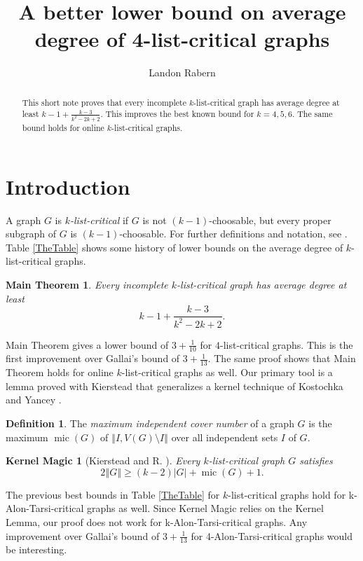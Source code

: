 \documentclass[12pt]{article}
\title{A better lower bound on average degree of 4-list-critical graphs}
\author{Landon Rabern}
\theoremstyle{plain}
\newtheorem*{KernelMagic}{Kernel Magic}
\newtheorem*{MainTheorem}{Main Theorem}
\theoremstyle{definition}
\newtheorem*{TheDefinition}{Definition}
\theoremstyle{remark}
\newcommand{\card}[1]{\left|#1\right|}
\newcommand{\size}[1]{\left\Vert#1\right\Vert}
\newcommand{\mic}{\operatorname{mic}}
\begin{document}
\maketitle
\begin{abstract}
		This short note proves that every incomplete $k$-list-critical graph has average degree at least $k-1 + \frac{k-3}{k^2-2k+2}$.  This improves the best known bound for $k = 4,5,6$.
		The same bound holds for online $k$-list-critical graphs.
\end{abstract}

\section{Introduction}
A graph $G$ is \emph{$k$-list-critical} if $G$ is not $(k-1)$-choosable, but every
proper subgraph of $G$ is $(k-1)$-choosable.  For further definitions and notation, see \cite{OreVizing, DischargingLowerBound}. 
Table \ref{TheTable} shows some history of lower bounds on the average degree of $k$-list-critical graphs.

\begin{MainTheorem}
	Every incomplete $k$-list-critical graph has average degree at least \[k-1 + \frac{k-3}{k^2-2k+2}.\]
\end{MainTheorem}

Main Theorem gives a lower bound of $3 + \frac{1}{10}$ for $4$-list-critical graphs. This is the first improvement over Gallai's bound of $3 + \frac{1}{13}$. 
The same proof shows that Main Theorem holds for online $k$-list-critical graphs as well.  Our primary tool is a lemma proved with Kierstead \cite{KernelMagic} 
that generalizes a kernel technique of Kostochka and Yancey \cite{kostochkayancey2012ore}.

\begin{TheDefinition} The \emph{maximum independent cover number }of a graph $G$
	is the maximum $\mic(G)$ of $\size{I, V(G) \setminus I}$ over all independent sets $I$
	of $G$. 
\end{TheDefinition}

\begin{KernelMagic}[Kierstead and R. \cite{KernelMagic}]\label{ConsantListMicStrength} 
	Every $k$-list-critical graph $G$ satisfies
	\[2\size{G} \ge (k-2)\card{G} + \mic(G) + 1.\]
\end{KernelMagic}
The previous best bounds in Table \ref{TheTable} for $k$-list-critical graphs hold for k-Alon-Tarsi-critical graphs as well. Since Kernel Magic relies on the Kernel Lemma, 
our proof does not work for k-Alon-Tarsi-critical graphs.  Any improvement over Gallai's bound of $3 + \frac{1}{13}$ for 4-Alon-Tarsi-critical graphs would be interesting.
\end{document}
